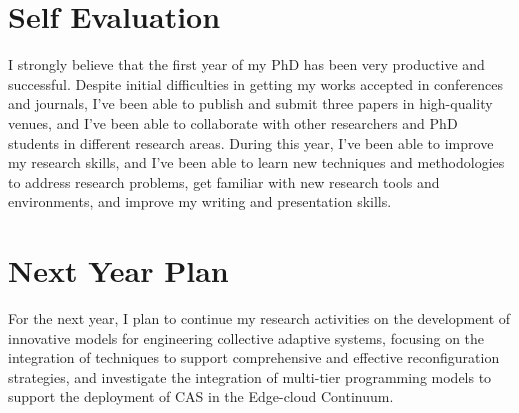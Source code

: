 \documentclass[runningheads]{llncs}
\begin{document}
\section{Self Evaluation}

I strongly believe that the first year of my PhD has been very productive and successful.
%
Despite initial difficulties in getting my works accepted in conferences and journals,
I've been able to publish and submit three papers in high-quality venues,
and I've been able to collaborate with other researchers and PhD students in different research areas.
%
During this year,
I've been able to improve my research skills,
and I've been able to learn new techniques and methodologies to address research problems,
get familiar with new research tools and environments,
and improve my writing and presentation skills.

\section{Next Year Plan}

For the next year,
I plan to continue my research activities on the development of innovative models for engineering collective adaptive systems,
focusing on the integration of techniques to support comprehensive and effective reconfiguration strategies,
and investigate the integration of multi-tier programming models to support the deployment of CAS in the Edge-cloud Continuum.

%
%
%
\nocite{*}


\end{document}
